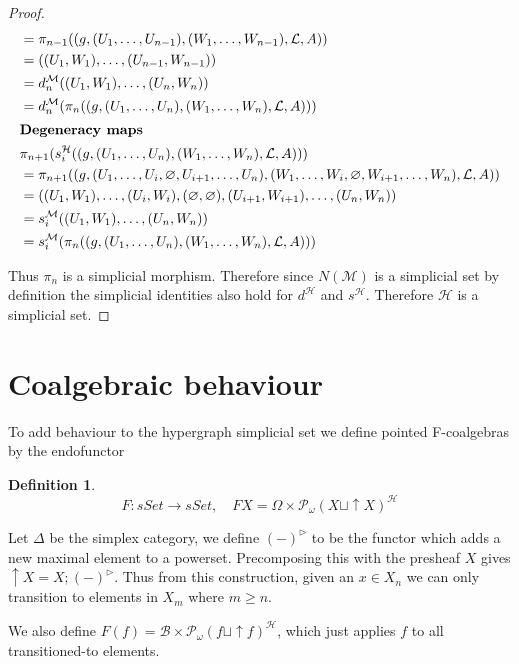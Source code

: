 \documentclass[12pt]{article}
\theoremstyle{definition}
\newtheorem{definition}[theorem]{Definition}
\newcommand{\1}{\mathbbm{1}}
\newcommand{\B}{\mathcal{B}}
\newcommand{\M}{\mathcal{M}}
\renewcommand{\H}{\mathcal{H}}
\newcommand{\finP}{\mathcal{P}_{\omega}}
\newcommand{\seq}{;}
\begin{document}
\begin{proof}
\begin{align*}
        &= \pi_{n-1}((g, (U_1, \ldots, U_{n-1}), (W_1, \ldots, W_{n-1}), \mathcal{L}, A)) \\
        &= ((U_1, W_1), \ldots, (U_{n-1}, W_{n-1})) \\
        &= d_n^\mathcal{M}((U_1, W_1), \ldots, (U_n, W_n)) \\
        &= d_n^\mathcal{M}(\pi_n((g, (U_1, \ldots, U_n), (W_1, \ldots, W_n), \mathcal{L}, A)))\\
        \intertext{\textbf{Degeneracy maps}}
        &\pi_{n+1}(s_i^\mathcal{H}((g, (U_1, \ldots, U_n), (W_1, \ldots, W_n), \mathcal{L}, A))) \\
        &= \pi_{n+1}((g, (U_1, \ldots, U_i, \varnothing, U_{i+1}, \ldots, U_n), (W_1, \ldots, W_i, \varnothing, W_{i+1}, \ldots, W_n), \mathcal{L}, A)) \\
        &= ((U_1, W_1), \ldots, (U_i, W_i), (\varnothing, \varnothing), (U_{i+1}, W_{i+1}), \ldots, (U_n, W_n)) \\
        &= s_i^\mathcal{M}((U_1, W_1), \ldots, (U_n, W_n)) \\
        &= s_i^\mathcal{M}(\pi_n((g, (U_1, \ldots, U_n), (W_1, \ldots, W_n), \mathcal{L}, A)))
    \end{align*}

    Thus $\pi_n$ is a simplicial morphism. Therefore since $N(\M)$ is a simplicial set by definition the simplicial identities also hold for $d^{\H}$ and $s^{\H}$. Therefore $\H$ is a simplicial set.
\end{proof}

\section{Coalgebraic behaviour}
To add behaviour to the hypergraph simplicial set we define pointed F-coalgebras by the endofunctor

\begin{definition}
    \[
        F: sSet \to sSet, \quad FX = \Omega \times \finP(X \sqcup \uparrow X)^{\H}
    \]
    
    Let $\Delta$ be the simplex category, we define $(-)^{\rhd}$ to be the functor which adds a new maximal element to a powerset. Precomposing this with the presheaf $X$ gives $\uparrow X = X\seq (-)^{\rhd}$. Thus from this construction, given an $x\in X_n$ we can only transition to elements in $X_m$ where $m\geq n$.
    
    We also define $F(f) = \B\times\finP(f \sqcup \uparrow f)^{\H}$, which just applies $f$ to all transitioned-to elements.
\end{definition}
\end{document}

